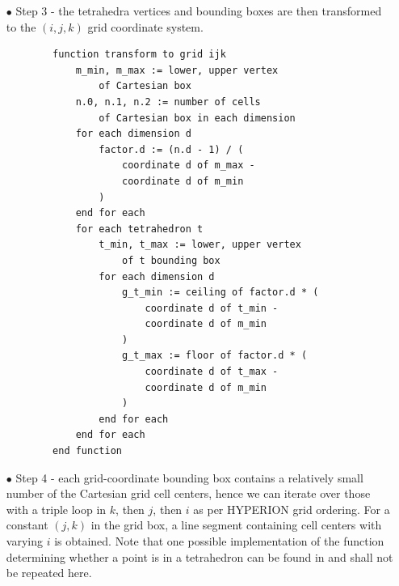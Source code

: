 \begin{itemize}
    \item[$\bullet$] Step 3 - the tetrahedra vertices and bounding boxes are then transformed to the $(i,j,k)$ grid coordinate system.

\begin{verbatim}
        function transform to grid ijk
            m_min, m_max := lower, upper vertex
                of Cartesian box
            n.0, n.1, n.2 := number of cells
                of Cartesian box in each dimension
            for each dimension d
                factor.d := (n.d - 1) / (
                    coordinate d of m_max -
                    coordinate d of m_min
                )
            end for each
            for each tetrahedron t
                t_min, t_max := lower, upper vertex
                    of t bounding box
                for each dimension d
                    g_t_min := ceiling of factor.d * (
                        coordinate d of t_min -
                        coordinate d of m_min
                    )
                    g_t_max := floor of factor.d * (
                        coordinate d of t_max -
                        coordinate d of m_min
                    )
                end for each
            end for each
        end function
\end{verbatim}

    \item[$\bullet$] Step 4 - each grid-coordinate bounding box contains a relatively small number of the Cartesian grid cell centers, hence we can iterate over those with a triple loop in $k$, then $j$, then $i$ as per HYPERION grid ordering. For a constant $(j,k)$ in the grid box, a line segment containing cell centers with varying $i$ is obtained. Note that one possible implementation of the function determining whether a point is in a tetrahedron can be found in \cite{schneider2002geometric} and shall not be repeated here.


\end{itemize}
